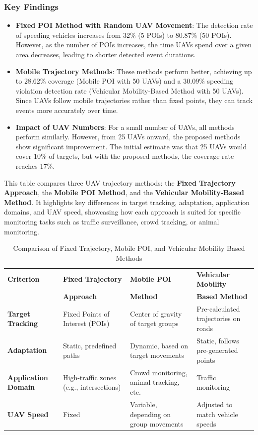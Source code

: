 \subsubsection{Key Findings}
\begin{itemize}
    \item \textbf{Fixed POI Method with Random UAV Movement}: The detection rate of speeding vehicles increases from 32\% (5 POIs) to 80.87\% (50 POIs). However, as the number of POIs increases, the time UAVs spend over a given area decreases, leading to shorter detected event durations.
    \item \textbf{Mobile Trajectory Methods}: These methods perform better, achieving up to 28.62\% coverage (Mobile POI with 50 UAVs) and a 30.09\% speeding violation detection rate (Vehicular Mobility-Based Method with 50 UAVs). Since UAVs follow mobile trajectories rather than fixed points, they can track events more accurately over time.
    \item \textbf{Impact of UAV Numbers}: For a small number of UAVs, all methods perform similarly. However, from 25 UAVs onward, the proposed methods show significant improvement. The initial estimate was that 25 UAVs would cover 10\% of targets, but with the proposed methods, the coverage rate reaches 17\%.
\end{itemize}

This table compares three UAV trajectory methods: the \textbf{Fixed Trajectory Approach}, the \textbf{Mobile POI Method}, and the \textbf{Vehicular Mobility-Based Method}. It highlights key differences in target tracking, adaptation, application domains, and UAV speed, showcasing how each approach is suited for specific monitoring tasks such as traffic surveillance, crowd tracking, or animal monitoring.

\begin{table}[H]
    \centering
    \begin{tabular}{|p{3cm}|p{4cm}|p{4cm}|p{4cm}|}
        \toprule
        \textbf{Criterion} & \textbf{Fixed Trajectory} & \textbf{Mobile POI} & \textbf{Vehicular Mobility} \\
        & \textbf{Approach} & \textbf{Method} & \textbf{Based Method} \\
        \midrule
        \textbf{Target Tracking} & Fixed Points of Interest (POIs) & Center of gravity of target groups & Pre-calculated trajectories on roads \\
        \midrule
        \textbf{Adaptation} & Static, predefined paths & Dynamic, based on target movements & Static, follows pre-generated points \\
        \midrule
        \textbf{Application Domain} & High-traffic zones (e.g., intersections) & Crowd monitoring, animal tracking, etc. & Traffic monitoring \\
        \midrule
        \textbf{UAV Speed} & Fixed & Variable, depending on group movements & Adjusted to match vehicle speeds \\
        \bottomrule
    \end{tabular}
    \caption{Comparison of Fixed Trajectory, Mobile POI, and Vehicular Mobility Based Methods}
    \label{tab:comparison_uav}
\end{table}

